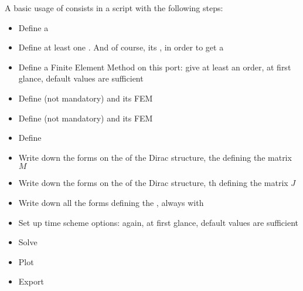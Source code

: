 \documentclass[letterpaper,10pt,english]{sphinxmanual}
\begin{document}
\sphinxAtStartPar
A basic usage of  consists in a script with the following steps:
\begin{itemize}
\item {} 
\sphinxAtStartPar
Define a 

\item {} 
\sphinxAtStartPar
Define at least one . And of course, its , in order to get a 

\item {} 
\sphinxAtStartPar
Define a Finite Element Method on this port: give at least an order, at first glance, default values are sufficient

\item {} 
\sphinxAtStartPar
Define  (not mandatory) and its FEM

\item {} 
\sphinxAtStartPar
Define  (not mandatory) and its FEM

\item {} 
\sphinxAtStartPar
Define 

\item {} 
\sphinxAtStartPar
Write down the forms on the  of the Dirac structure,  the  defining the matrix \(M\)

\item {} 
\sphinxAtStartPar
Write down the forms on the  of the Dirac structure,  th  defining the matrix \(J\)

\item {} 
\sphinxAtStartPar
Write down all the forms defining the , always with 

\item {} 
\sphinxAtStartPar
Set up time scheme options: again, at first glance, default values are sufficient

\item {} 
\sphinxAtStartPar
Solve

\item {} 
\sphinxAtStartPar
Plot

\item {} 
\sphinxAtStartPar
Export

\end{itemize}
\end{document}
